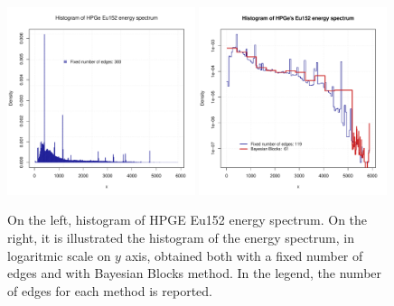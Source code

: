 \documentclass[prb,twocolumn]{revtex4-1}
\begin{document}
\begin{figure}[t!]
    \centering 
    \includegraphics[width=0.49\textwidth]{images/plot_HPGe_2.pdf}
    \hskip 1mm
   \includegraphics[width=0.49\textwidth]{images/hist_HPGe_2.pdf}
    \caption{On the left, histogram of HPGE Eu152 energy spectrum. On the right, it is illustrated the histogram of the energy spectrum, in logaritmic scale on $y$ axis, obtained both with a fixed number of edges and with Bayesian Blocks method. In the legend, the number of edges for each method is reported.}
    \label{fig:HPGe_2}
\end{figure}
\end{document}
